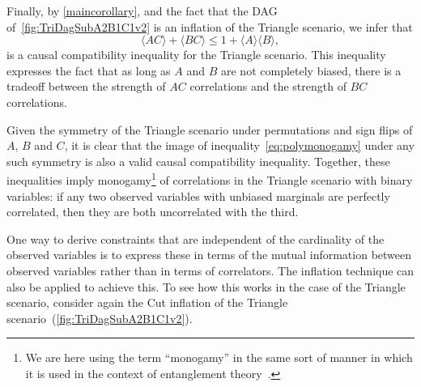 {Finally, by \cref{maincorollary}, and the fact that the DAG of~\cref{fig:TriDagSubA2B1C1v2} is an inflation of the Triangle scenario,
 we infer that 
\begin{equation}
	\label{eq:polymonogamy}
	\langle A C\rangle + \langle B C\rangle \leq 1 + \langle A\rangle \langle B\rangle,
\end{equation}
is a causal compatibility inequality for the Triangle scenario.   This inequality expresses the fact that as long as $A$ and $B$ are not completely biased, there is a tradeoff between the strength of $AC$ correlations and the strength of $BC$ correlations.   

Given the symmetry of the Triangle scenario under permutations and sign flips of $A$, $B$ and $C$, it is clear that the image of inequality~\cref{eq:polymonogamy} under any such symmetry is also a valid causal compatibility inequality.  Together, these inequalities imply monogamy\footnote{We are here using the term ``monogamy'' in the same sort of manner in which it is used in the context of entanglement theory~\cite{horo4}.}  of correlations in the Triangle scenario with binary variables:  if any two observed variables with unbiased marginals are perfectly correlated, then they are both uncorrelated with the third.




\smallskip\nobreak

One way to derive constraints that are independent of the cardinality of the observed variables is to express these in terms of the mutual information between observed variables rather than in terms of correlators.  The inflation technique can also be applied to achieve this.
To see how this works in the case of the Triangle scenario, consider again the Cut inflation of the Triangle scenario~(\cref{fig:TriDagSubA2B1C1v2}).  

}
